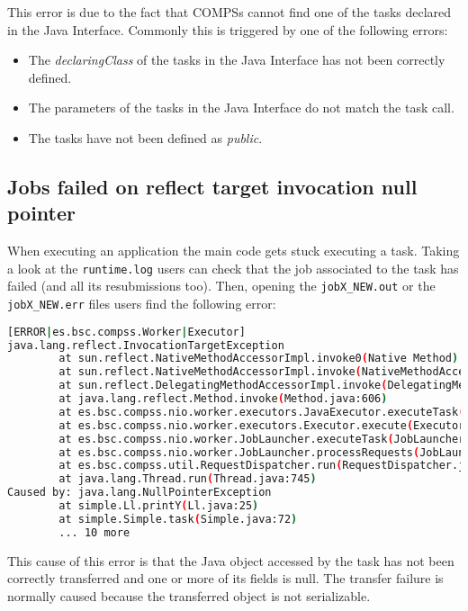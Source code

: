 This error is due to the fact that COMPSs cannot find one of the tasks declared in the Java Interface. Commonly this is triggered by
one of the following errors:

\begin{itemize}
 \item The \textit{declaringClass} of the tasks in the Java Interface has not been correctly defined.
 \item The parameters of the tasks in the Java Interface do not match the task call.
 \item The tasks have not been defined as \textit{public}.
\end{itemize}


%
%
\subsection{Jobs failed on reflect target invocation null pointer}

When executing an application the main code gets stuck executing a task. Taking a look at the \texttt{runtime.log} users can check
that the job associated to the task has failed (and all its resubmissions too). Then, opening the \texttt{jobX\_NEW.out} or the
\texttt{jobX\_NEW.err} files users find the following error:

\begin{lstlisting}[language=bash]
[ERROR|es.bsc.compss.Worker|Executor]
java.lang.reflect.InvocationTargetException
        at sun.reflect.NativeMethodAccessorImpl.invoke0(Native Method)
        at sun.reflect.NativeMethodAccessorImpl.invoke(NativeMethodAccessorImpl.java:57)
        at sun.reflect.DelegatingMethodAccessorImpl.invoke(DelegatingMethodAccessorImpl.java:43)
        at java.lang.reflect.Method.invoke(Method.java:606)
        at es.bsc.compss.nio.worker.executors.JavaExecutor.executeTask(JavaExecutor.java:154)
        at es.bsc.compss.nio.worker.executors.Executor.execute(Executor.java:42)
        at es.bsc.compss.nio.worker.JobLauncher.executeTask(JobLauncher.java:46)
        at es.bsc.compss.nio.worker.JobLauncher.processRequests(JobLauncher.java:34)
        at es.bsc.compss.util.RequestDispatcher.run(RequestDispatcher.java:46)
        at java.lang.Thread.run(Thread.java:745)
Caused by: java.lang.NullPointerException
        at simple.Ll.printY(Ll.java:25)
        at simple.Simple.task(Simple.java:72)
        ... 10 more
\end{lstlisting}

This cause of this error is that the Java object accessed by the task has not been correctly transferred and one or more of its fields
is null. The transfer failure is normally caused because the transferred object is not serializable. 

